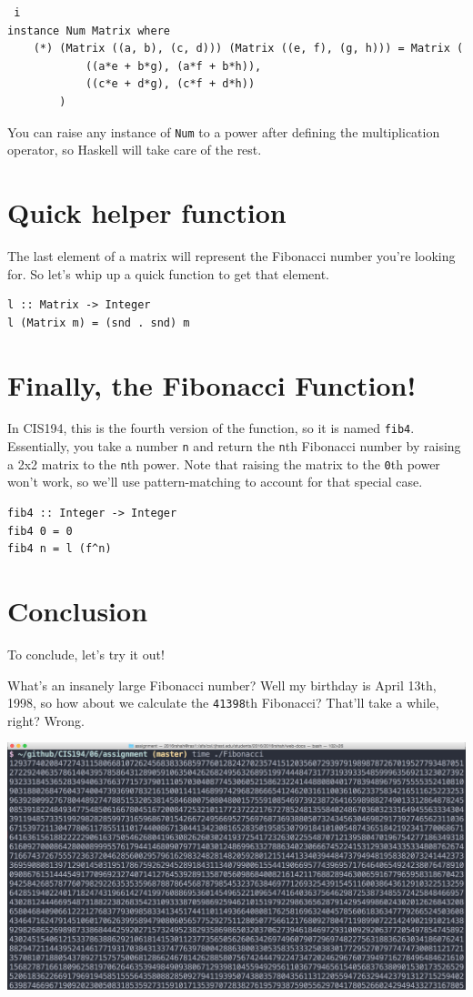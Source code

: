 \documentclass[12pt]{article}
\begin{document}
	\begin{lstlisting} i
instance Num Matrix where
	(*) (Matrix ((a, b), (c, d))) (Matrix ((e, f), (g, h))) = Matrix (
			((a*e + b*g), (a*f + b*h)), 
			((c*e + d*g), (c*f + d*h))
		) 
	\end{lstlisting}

	You can raise any instance of \texttt{Num} to a power after defining the
	multiplication operator, so Haskell will take care of the rest.

	\section{Quick helper function}\label{quick-helper-function}

	The last element of a matrix will represent the Fibonacci number you're
	looking for. So let's whip up a quick function to get that element.

	\begin{lstlisting} 
l :: Matrix -> Integer 
l (Matrix m) = (snd . snd) m 
	\end{lstlisting}

	\section{Finally, the Fibonacci
	Function!}\label{finally-the-fibonacci-function}

	In CIS194, this is the fourth version of the function, so it is named
	\texttt{fib4}. Essentially, you take a number \texttt{n} and return the
	\texttt{n}th Fibonacci number by raising a 2x2 matrix to the
	\texttt{n}th power. Note that raising the matrix to the \texttt{0}th
	power won't work, so we'll use pattern-matching to account for that
	special case.

	\begin{lstlisting} 
fib4 :: Integer -> Integer 
fib4 0 = 0 
fib4 n = l (f^n) 
	\end{lstlisting}

	\section{Conclusion}\label{conclusion}

	To conclude, let's try it out!

	What's an insanely large Fibonacci number? Well my birthday is April
	13th, 1998, so how about we calculate the \texttt{41398}th Fibonacci?
	That'll take a while, right? Wrong.


	\includegraphics[width=6in]{Fibonacci_ss_1}
\end{document}
